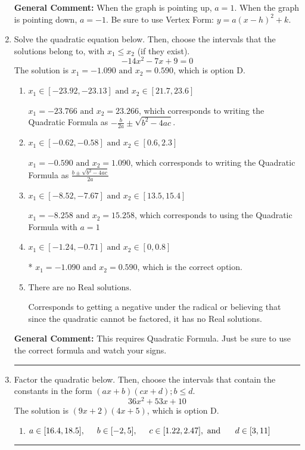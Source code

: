 \documentclass{extbook}[14pt]
\newcommand{\litem}[1]{\item #1

\rule{\textwidth}{0.4pt}}
\begin{document}
\begin{enumerate}
{\textbf{General Comment:} When the graph is pointing up, $a=1$. When the graph is pointing down, $a=-1$. Be sure to use Vertex Form: $y = a(x-h)^2+k$.
}
\litem{
Solve the quadratic equation below. Then, choose the intervals that the solutions belong to, with $x_1 \leq x_2$ (if they exist).
\[ -14x^{2} -7 x + 9 = 0 \]The solution is \( x_1 = -1.090 \text{ and } x_2 = 0.590 \), which is option D.\begin{enumerate}[label=\Alph*.]
\item \( x_1 \in [-23.92, -23.13] \text{ and } x_2 \in [21.7, 23.6] \)

 $x_1 = -23.766 \text{ and } x_2 = 23.266$, which corresponds to writing the Quadratic Formula as $-\frac{b}{2a} \pm \sqrt{b^2 - 4ac}$.
\item \( x_1 \in [-0.62, -0.58] \text{ and } x_2 \in [0.6, 2.3] \)

 $x_1 = -0.590 \text{ and } x_2 = 1.090$, which corresponds to writing the Quadratic Formula as $\frac{b \pm \sqrt{b^2 - 4ac}}{2a}$
\item \( x_1 \in [-8.52, -7.67] \text{ and } x_2 \in [13.5, 15.4] \)

 $x_1 = -8.258 \text{ and } x_2 = 15.258$, which corresponds to using the Quadratic Formula with $a=1$
\item \( x_1 \in [-1.24, -0.71] \text{ and } x_2 \in [0, 0.8] \)

* $x_1 = -1.090 \text{ and } x_2 = 0.590$, which is the correct option.
\item \( \text{There are no Real solutions.} \)

Corresponds to getting a negative under the radical or believing that since the quadratic cannot be factored, it has no Real solutions.
\end{enumerate}

\textbf{General Comment:} This requires Quadratic Formula. Just be sure to use the correct formula and watch your signs.
}
\litem{
Factor the quadratic below. Then, choose the intervals that contain the constants in the form $(ax+b)(cx+d); b \leq d.$
\[ 36x^{2} +53 x + 10 \]The solution is \( (9x + 2)(4x + 5) \), which is option D.\begin{enumerate}[label=\Alph*.]
\item \( a \in [16.4, 18.5], \hspace*{5mm} b \in [-2, 5], \hspace*{5mm} c \in [1.22, 2.47], \text{ and } \hspace*{5mm} d \in [3, 11] \)


\end{enumerate}}
\end{enumerate}
\end{document}
